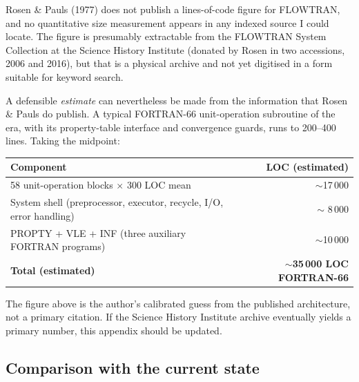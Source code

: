 \documentclass[11pt,a4paper]{article}
\begin{document}
Rosen \& Pauls (1977) does not publish a lines-of-code figure for
FLOWTRAN, and no quantitative size measurement appears in any
indexed source I could locate.  The figure is presumably extractable
from the FLOWTRAN System Collection at the Science History Institute
(donated by Rosen in two accessions, 2006 and 2016), but that is a
physical archive and not yet digitised in a form suitable for
keyword search.

A defensible \emph{estimate} can nevertheless be made from the
information that Rosen \& Pauls do publish.  A typical FORTRAN-66
unit-operation subroutine of the era, with its property-table
interface and convergence guards, runs to 200--400 lines.  Taking the
midpoint:

\begin{center}\small
\begin{tabularx}{\linewidth}{@{}lr@{}}
\toprule
\textbf{Component}                 & \textbf{LOC (estimated)} \\
\midrule
58 unit-operation blocks $\times$ 300 LOC mean &  $\sim$17\,000 \\
System shell (preprocessor, executor, recycle, I/O, error handling) &  $\sim$ 8\,000 \\
PROPTY + VLE + INF (three auxiliary FORTRAN programs)       &  $\sim$10\,000 \\
\midrule
\textbf{Total (estimated)}                            &  \textbf{$\sim$35\,000 LOC FORTRAN-66} \\
\bottomrule
\end{tabularx}
\end{center}

The figure above is the author's calibrated guess from the published
architecture, not a primary citation.  If the Science History
Institute archive eventually yields a primary number, this appendix
should be updated.

\subsection*{Comparison with the current state}
\end{document}
